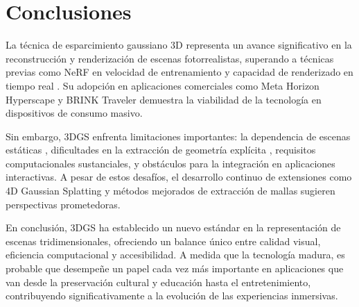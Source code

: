 \documentclass[lettersize,journal]{IEEEtran}
\begin{document}
\section{Conclusiones}

La técnica de esparcimiento gaussiano 3D representa un avance significativo en la reconstrucción y renderización de escenas fotorrealistas, superando a técnicas previas como NeRF en velocidad de entrenamiento y capacidad de renderizado en tiempo real \cite{Kerbl2023}. Su adopción en aplicaciones comerciales como Meta Horizon Hyperscape \cite{MetaHorizon} y BRINK Traveler \cite{BrinkXR} demuestra la viabilidad de la tecnología en dispositivos de consumo masivo.

Sin embargo, 3DGS enfrenta limitaciones importantes: la dependencia de escenas estáticas \cite{Kerbl2023, Matias2025}, dificultades en la extracción de geometría explícita \cite{Gudon2024}, requisitos computacionales sustanciales, y obstáculos para la integración en aplicaciones interactivas. A pesar de estos desafíos, el desarrollo continuo de extensiones como 4D Gaussian Splatting \cite{Wu2024} y métodos mejorados de extracción de mallas \cite{Gudon2024} sugieren perspectivas prometedoras.

En conclusión, 3DGS ha establecido un nuevo estándar en la representación de escenas tridimensionales, ofreciendo un balance único entre calidad visual, eficiencia computacional y accesibilidad. A medida que la tecnología madura, es probable que desempeñe un papel cada vez más importante en aplicaciones que van desde la preservación cultural y educación hasta el entretenimiento, contribuyendo significativamente a la evolución de las experiencias inmersivas.



\end{document}
